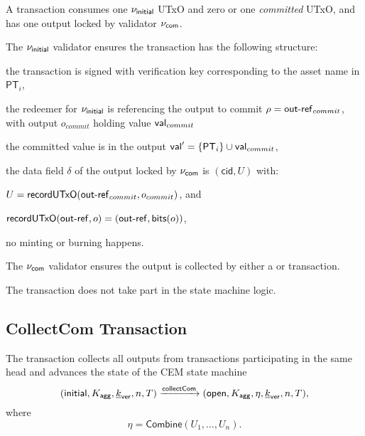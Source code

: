 A \mtxCom{} transaction consumes one $\nu_\mathsf{initial}$ UTxO and zero or one \emph{committed} UTxO, and has one output locked by validator $\nu_\mathsf{com}$.

\noindent The $\nu_\mathsf{initial}$ validator ensures the transaction has the following structure:
\begin{menumerate}
    \item the transaction is signed with verification key corresponding to the asset name in $\mathsf{PT}_i$,
    \item the redeemer for $\nu_\mathsf{initial}$ is referencing the output to commit $ \rho = \mathsf{out\textsf{-}{}ref}_{commit}$, with output $o_{commit}$ holding value $\mathsf{val}_{commit}$
    \item the committed value is in the output $\mathsf{val}' = \{\mathsf{PT}_{i}\} \cup \mathsf{val}_{commit} $,
    \item the data field $\delta$ of the output locked by $\nu_\mathsf{com}$ is $(\mathsf{cid}, U)$ with:
    \begin{menumerate}
        \item $U = \mathsf{recordUTxO}(\mathsf{out\textsf{-}{}ref}_{commit},o_{commit})$, and 
        \item $\mathsf{recordUTxO} (\mathsf{out\textsf{-}{}ref}, o) = (\mathsf{out\textsf{-}{}ref}, \mathsf{bits}(o))$,
    \end{menumerate}        
    \item no minting or burning happens.
\end{menumerate}

\noindent The $\nu_\mathsf{com}$ validator ensures the output is collected by either a \mtxCCom{} or \mtxAbort{} transaction.
\begin{boxM}
The \mtxCom{} transaction does not take part in the state machine logic.
\end{boxM}

\subsection{CollectCom Transaction}



The \mtxCCom{} transaction collects all outputs from \mtxCom{} transactions participating in the same head and advances the state of the CEM state machine
$$
   (\mathsf{initial},K_{\mathsf{agg}},\underline{k}_{\mathsf{ver}},n,T) \xrightarrow{\mathsf{collectCom}} (\mathsf{open},K_{\mathsf{agg}},\eta,\underline{k}_{\mathsf{ver}},n,T),
$$
where
$$
\eta = \mathsf{Combine}(U_{1}, \ldots, U_{n}).
$$

